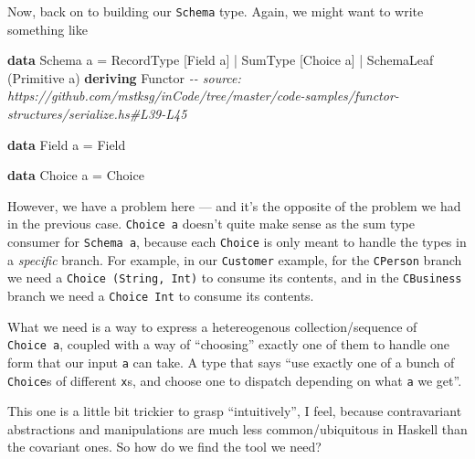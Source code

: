 \documentclass[]{article}
\newenvironment{Shaded}{}{}
\newcommand{\CommentTok}[1]{\textcolor[rgb]{0.38,0.63,0.69}{\textit{#1}}}
\newcommand{\DataTypeTok}[1]{\textcolor[rgb]{0.56,0.13,0.00}{#1}}
\newcommand{\KeywordTok}[1]{\textcolor[rgb]{0.00,0.44,0.13}{\textbf{#1}}}
\newcommand{\NormalTok}[1]{#1}
\newcommand{\OperatorTok}[1]{\textcolor[rgb]{0.40,0.40,0.40}{#1}}
\newcommand{\OtherTok}[1]{\textcolor[rgb]{0.00,0.44,0.13}{#1}}
\begin{document}
Now, back on to building our \texttt{Schema} type. Again, we might want to write
something like

\begin{Shaded}
\begin{Highlighting}[]
\KeywordTok{data} \DataTypeTok{Schema}\NormalTok{ a }\OtherTok{=}
      \DataTypeTok{RecordType}\NormalTok{  [}\DataTypeTok{Field}\NormalTok{ a]}
    \OperatorTok{|} \DataTypeTok{SumType}\NormalTok{     [}\DataTypeTok{Choice}\NormalTok{ a]}
    \OperatorTok{|} \DataTypeTok{SchemaLeaf}\NormalTok{  (}\DataTypeTok{Primitive}\NormalTok{ a)}
  \KeywordTok{deriving} \DataTypeTok{Functor}
\CommentTok{{-}{-} source: https://github.com/mstksg/inCode/tree/master/code{-}samples/functor{-}structures/serialize.hs\#L39{-}L45}

\KeywordTok{data} \DataTypeTok{Field}\NormalTok{ a }\OtherTok{=} \DataTypeTok{Field}

\KeywordTok{data} \DataTypeTok{Choice}\NormalTok{ a }\OtherTok{=} \DataTypeTok{Choice}
\end{Highlighting}
\end{Shaded}

However, we have a problem here --- and it's the opposite of the problem we had
in the previous case. \texttt{Choice\ a} doesn't quite make sense as the sum
type consumer for \texttt{Schema\ a}, because each \texttt{Choice} is only meant
to handle the types in a \emph{specific} branch. For example, in our
\texttt{Customer} example, for the \texttt{CPerson} branch we need a
\texttt{Choice\ (String,\ Int)} to consume its contents, and in the
\texttt{CBusiness} branch we need a \texttt{Choice\ Int} to consume its
contents.

What we need is a way to express a hetereogenous collection/sequence of
\texttt{Choice\ a}, coupled with a way of ``choosing'' exactly one of them to
handle one form that our input \texttt{a} can take. A type that says ``use
exactly one of a bunch of \texttt{Choice}s of different \texttt{x}s, and choose
one to dispatch depending on what \texttt{a} we get''.

This one is a little bit trickier to grasp ``intuitively'', I feel, because
contravariant abstractions and manipulations are much less common/ubiquitous in
Haskell than the covariant ones. So how do we find the tool we need?
\end{document}
